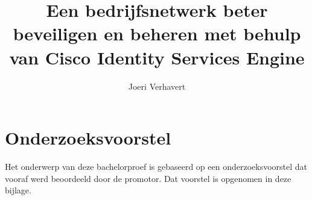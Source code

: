 \documentclass{bachproef-tin}
\title{Een bedrijfsnetwerk beter beveiligen en beheren met behulp van Cisco Identity Services Engine}
\author{Joeri Verhavert}
\begin{document}
\inserttitlepage

\usechapterimagefalse



\pagestyle{empty} %
\tableofcontents  %
\cleardoublepage  %
\pagestyle{fancy} %



\listoffigures
\listoftables








\appendix
\renewcommand{\chaptername}{Appendix}


\chapter{Onderzoeksvoorstel}

Het onderwerp van deze bachelorproef is gebaseerd op een onderzoeksvoorstel dat vooraf werd beoordeeld door de promotor. Dat voorstel is opgenomen in deze bijlage.





\printbibliography[heading=bibintoc]
\end{document}
